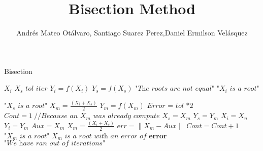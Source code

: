 \documentclass{article}
\title{Bisection Method}
\author{Andrés Mateo Otálvaro, Santiago Suarez Perez,Daniel Ermilson Velásquez}
\begin{document}
\maketitle
\begin{algorithm}
\caption{Bisection}\label{numerical methods}
\begin{algorithmic}[1]
\State $\textit{$X_i$}$\;
\State $\textit{$X_s$}$\;
\State $\textit{tol}$\;
\State $\textit{iter}$\;
\State $Y_i=f(X_i)$\;
\State$Y_s=f(X_s)$\;
		\State $\textit{"The roots are not equal"}$
		\State $\textit{"$X_i$ is a root"}$
	
		\State $\textit{"$X_s$ is a root"}$ 
	\Else
		\State $X_m=\frac{(X_i+X_s)}{2}$
		\State $Y_m=f(X_m)$
		\State $\textit{Error\ = tol *2}$ 
		\State $Cont=1\ \textit{//Because an $X_m$ was already compute}$
				\State $X_s=X_m$
				\State $Y_s=Y_m$
			\Else 
				\State $X_i=X_n$
				\State $Y_i=Y_m$
			\EndIf
				\State $Aux=X_m$
				\State $X_m=\frac{(X_i+X_s)}{2}$
				\State $err= \|X_m-Aux \| $
				\State $Cont=Cont+1$
		\EndWhile
			\State $\textit{"$X_m$ is a root"}$
			\State $\textit{$X_m$ is a root with an error of\ } \textbf{error}$ 
			\State $\textit{"We have ran out of iterations"}$
		\EndIf
	\EndIf
\EndProcedure
\end{algorithmic}
\end{algorithm}
\end{document}
